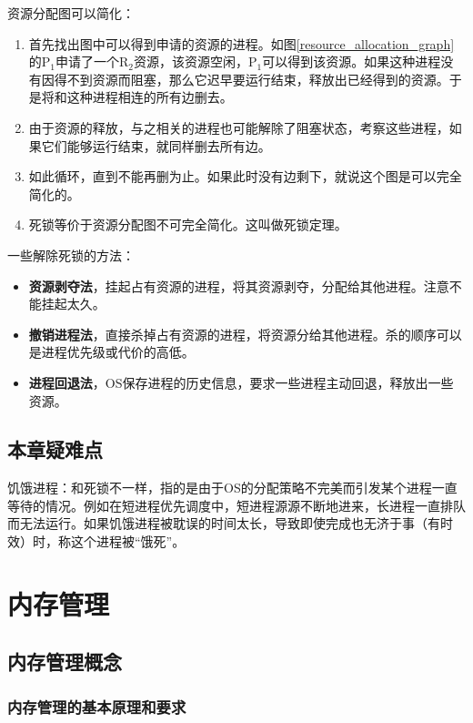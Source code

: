 \documentclass[12pt, a4paper, oneside]{ctexart}
\begin{document}
资源分配图可以简化：
\begin{enumerate}
  \item 首先找出图中可以得到申请的资源的进程。如图\ref{resource_allocation_graph}的P$_1$申请了一个R$_2$资源，该资源空闲，P$_1$可以得到该资源。如果这种进程没有因得不到资源而阻塞，那么它迟早要运行结束，释放出已经得到的资源。于是将和这种进程相连的所有边删去。
  \item 由于资源的释放，与之相关的进程也可能解除了阻塞状态，考察这些进程，如果它们能够运行结束，就同样删去所有边。
  \item 如此循环，直到不能再删为止。如果此时没有边剩下，就说这个图是可以完全简化的。
  \item 死锁等价于资源分配图不可完全简化。这叫做死锁定理。
\end{enumerate}

一些解除死锁的方法：
\begin{itemize}
  \item {\bf 资源剥夺法}，挂起占有资源的进程，将其资源剥夺，分配给其他进程。注意不能挂起太久。
  \item {\bf 撤销进程法}，直接杀掉占有资源的进程，将资源分给其他进程。杀的顺序可以是进程优先级或代价的高低。
  \item {\bf 进程回退法}，OS保存进程的历史信息，要求一些进程主动回退，释放出一些资源。
\end{itemize}

\subsection{本章疑难点}

饥饿进程：和死锁不一样，指的是由于OS的分配策略不完美而引发某个进程一直等待的情况。例如在短进程优先调度中，短进程源源不断地进来，长进程一直排队而无法运行。如果饥饿进程被耽误的时间太长，导致即使完成也无济于事（有时效）时，称这个进程被“饿死”。

\section{内存管理}

\subsection{内存管理概念}

\subsubsection{内存管理的基本原理和要求}
\end{document}
